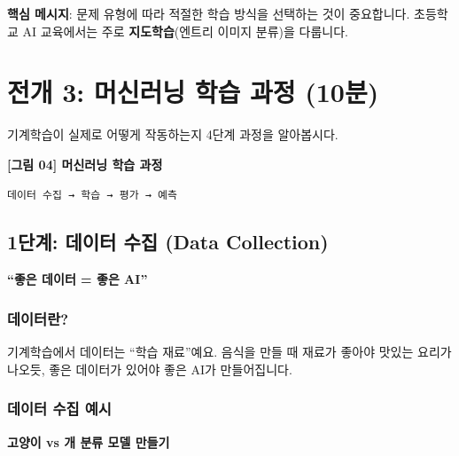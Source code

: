 \documentclass[a4paper, 11pt]{article}
\renewenvironment{quote}
  {\begin{tcolorbox}[colback=lightblue!30, colframe=mainblue!50,
   left=8pt, right=8pt, top=4pt, bottom=4pt, breakable]}
  {\end{tcolorbox}}
\begin{document}
\begin{quote}
 \textbf{핵심 메시지}: 문제 유형에 따라 적절한 학습 방식을 선택하는
것이 중요합니다. 초등학교 AI 교육에서는 주로 \textbf{지도학습}(엔트리
이미지 분류)을 다룹니다.
\end{quote}

\hypertarget{uxc804uxac1c-3-uxba38uxc2e0uxb7ecuxb2dd-uxd559uxc2b5-uxacfcuxc815-10uxbd84}{%
\section{ 전개 3: 머신러닝 학습 과정
(10분)}\label{uxc804uxac1c-3-uxba38uxc2e0uxb7ecuxb2dd-uxd559uxc2b5-uxacfcuxc815-10uxbd84}}

기계학습이 실제로 어떻게 작동하는지 4단계 과정을 알아봅시다.

\textbf{{[}그림 04{]} 머신러닝 학습 과정}

\begin{verbatim}
데이터 수집 → 학습 → 평가 → 예측
\end{verbatim}

\hypertarget{uxb2e8uxacc4-uxb370uxc774uxd130-uxc218uxc9d1-data-collection}{%
\subsection{1단계: 데이터 수집 (Data
Collection)}\label{uxb2e8uxacc4-uxb370uxc774uxd130-uxc218uxc9d1-data-collection}}

\begin{quote}
\textbf{``좋은 데이터 = 좋은 AI''}
\end{quote}

\hypertarget{uxb370uxc774uxd130uxb780}{%
\subsubsection{데이터란?}\label{uxb370uxc774uxd130uxb780}}

기계학습에서 데이터는 ``학습 재료''예요. 음식을 만들 때 재료가 좋아야
맛있는 요리가 나오듯, 좋은 데이터가 있어야 좋은 AI가 만들어집니다.

\hypertarget{uxb370uxc774uxd130-uxc218uxc9d1-uxc608uxc2dc}{%
\subsubsection{데이터 수집
예시}\label{uxb370uxc774uxd130-uxc218uxc9d1-uxc608uxc2dc}}

\textbf{고양이 vs 개 분류 모델 만들기}
\end{document}
